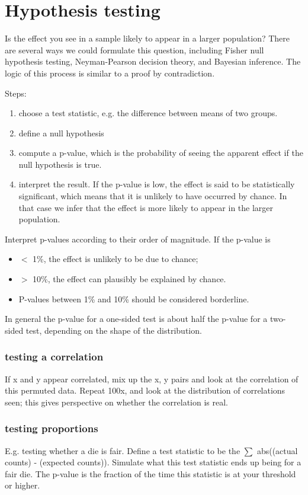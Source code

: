 \section{Hypothesis testing}
Is the effect you see in a sample likely to appear in a larger population? 
There are several ways we could formulate this question, including Fisher null hypothesis testing, Neyman-Pearson decision theory, and Bayesian inference.
The logic of this process is similar to a proof by contradiction.

Steps:
\begin{enumerate}
	\item choose a test statistic, e.g. the difference between means of two groups. 
	\item define a null hypothesis
	\item compute a p-value, which is the probability of seeing the apparent effect if the null hypothesis is true. 
	\item interpret the result. If the p-value is low, the effect is said to be statistically significant, 
		which means that it is unlikely to have occurred by chance. 
		In that case we infer that the effect is more likely to appear in the larger population.
\end{enumerate}

Interpret p-values according to their order of magnitude.  If the p-value is
\begin{itemize}
	\item  $<$ 1\%, the effect is unlikely to be due to chance; 
	\item $>$ 10\%, the effect can plausibly be explained by chance. 
	\item P-values between 1\% and 10\% should be considered borderline.
\end{itemize}

In general the p-value for a one-sided test is about half the p-value for a two-sided test, depending on the shape of the distribution.

\subsubsection{testing a correlation}
If x and y appear correlated, mix up the x, y pairs and look at the correlation of this permuted data. 
Repeat 100x, and look at the distribution of correlations seen; 
	this gives perspective on whether the correlation is real. 
	
\subsubsection{testing proportions}
E.g. testing whether a die is fair. 
Define a test statistic to be the $\sum$ abs((actual counts) - (expected counts)).
Simulate what this test statistic ends up being for a fair die.
The p-value is the fraction of the time this statistic is at your threshold or higher. 

